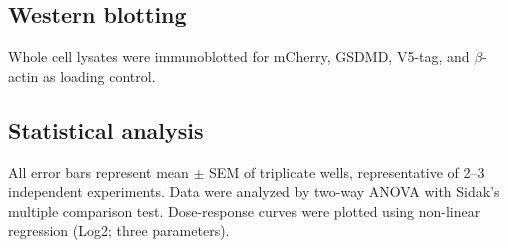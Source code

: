 \documentclass[11pt]{article}
\begin{document}
\subsection{Western blotting}
Whole cell lysates were immunoblotted for mCherry, GSDMD, V5-tag, and $\beta$-actin as loading control.

\subsection{Statistical analysis}
All error bars represent mean $\pm$ SEM of triplicate wells, representative of 2--3 independent experiments. Data were analyzed by two-way ANOVA with Sidak's multiple comparison test. Dose-response curves were plotted using non-linear regression (Log2; three parameters).



\end{document}
